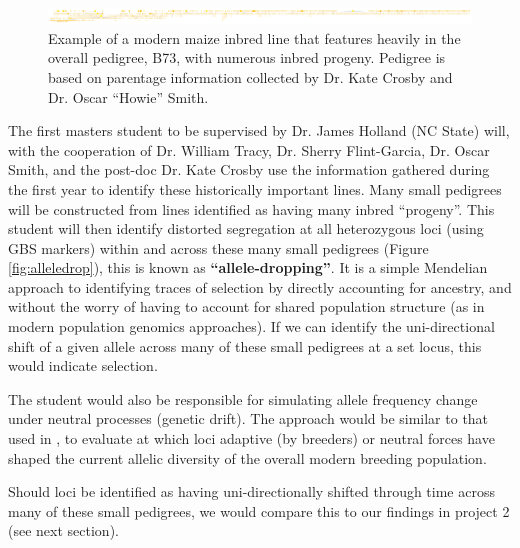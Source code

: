 \documentclass[12pt]{article}
\begin{document}
\begin{figure}[ht]
\includegraphics[width=1.0\linewidth]{pedigree_poster.pdf}
\caption{Example of a modern maize inbred line that features heavily in the overall pedigree, B73, with numerous inbred progeny. Pedigree is based on parentage information collected by Dr. Kate Crosby and Dr. Oscar ``Howie'' Smith.}
\label{fig:b73isbig}
\end{figure}

\par The first masters student to be supervised by Dr. James Holland (NC State) will, with the cooperation of Dr. William Tracy, Dr. Sherry Flint-Garcia, Dr. Oscar Smith, and the post-doc Dr. Kate Crosby use the information gathered during the first year to identify these historically important lines. Many small pedigrees will be constructed from lines identified as having many inbred ``progeny''. This student will then identify distorted segregation at all heterozygous loci (using GBS markers) within and across these many small pedigrees (Figure \ref{fig:alleledrop}), this is known as \textbf{``allele-dropping''}. It is a simple Mendelian approach to identifying traces of selection by directly accounting for ancestry, and without the worry of having to account for shared population structure (as in modern population genomics approaches). If we can identify the uni-directional shift of a given allele across many of these small pedigrees at a set locus, this would indicate selection. 
\par The student would also be responsible for simulating allele frequency change under neutral processes (genetic drift). The approach would be similar to that used in \citep{Gerke:2013tw}, to evaluate at which loci adaptive (by breeders) or neutral forces have shaped the current allelic diversity of the overall modern breeding population. 
\par Should loci be identified as having uni-directionally shifted through time across many of these small pedigrees, we would compare this to our findings in project 2 (see next section).
\end{document}
